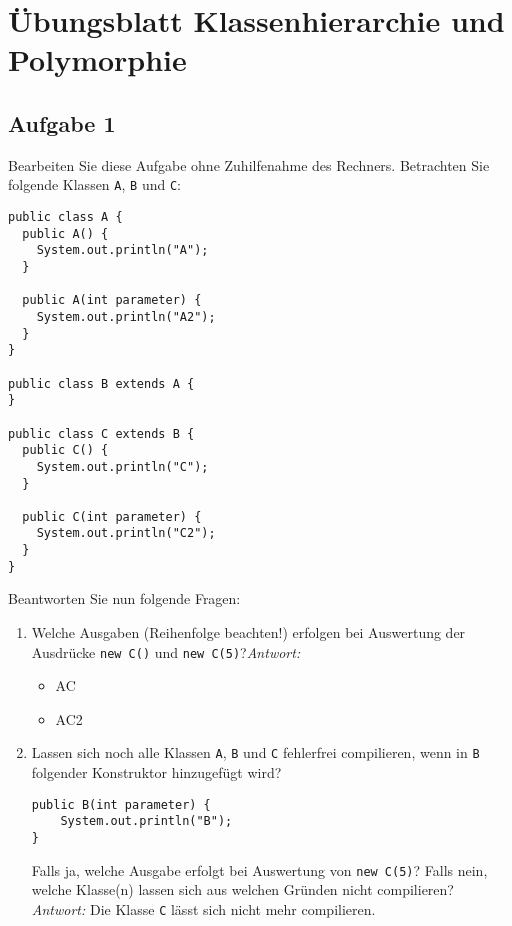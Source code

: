 \chapter{Übungsblatt Klassenhierarchie und Polymorphie}

\section{Aufgabe 1}
Bearbeiten Sie diese Aufgabe ohne Zuhilfenahme des Rechners. Betrachten Sie
folgende Klassen \lstinline{A}, \lstinline{B} und \lstinline{C}:

\begin{lstlisting}
public class A {
  public A() {
    System.out.println("A");
  }

  public A(int parameter) {
    System.out.println("A2");
  }
}

public class B extends A {
}

public class C extends B {
  public C() {
    System.out.println("C");
  }

  public C(int parameter) {
    System.out.println("C2");
  }
}
\end{lstlisting}

Beantworten Sie nun folgende Fragen:

\begin{enumerate}
    \item Welche Ausgaben (Reihenfolge beachten!) erfolgen bei Auswertung der Ausdrücke
          \lstinline{new C()} und \lstinline{new C(5)}?\newline \textit{Antwort:} \begin{itemize}
              \item[\lstinline{new C()}] AC
              \item[\lstinline{new C(5)}] AC2
          \end{itemize} \pagebreak
    \item Lassen sich noch alle Klassen \lstinline{A}, \lstinline{B} und \lstinline{C} fehlerfrei compilieren, wenn in \lstinline{B}
          folgender Konstruktor hinzugefügt wird?
          \begin{lstlisting}
public B(int parameter) {
    System.out.println("B");
}
            \end{lstlisting}
          Falls ja, welche Ausgabe erfolgt bei Auswertung von \lstinline{new C(5)}? Falls nein,
          welche Klasse(n) lassen sich aus welchen Gründen nicht compilieren?\newline
          \textit{Antwort:} Die Klasse \lstinline{C} lässt sich nicht mehr compilieren.
\end{enumerate}

